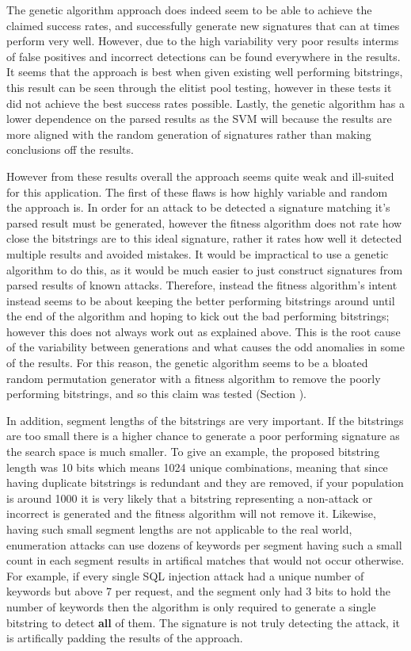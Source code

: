 The genetic algorithm approach does indeed seem to be able to achieve the claimed success rates, and successfully generate new signatures that can at times perform very well.  However, due to the high variability very poor results interms of false positives and incorrect detections can be found everywhere in the results.  It seems that the approach is best when given existing well performing bitstrings, this result can be seen through the elitist pool testing, however in these tests it did not achieve the best success rates possible.  Lastly, the genetic algorithm has a lower dependence on the parsed results as the SVM will because the results are more aligned with the random generation of signatures rather than making conclusions off the results.

However from these results overall the approach seems quite weak and ill-suited for this application.  The first of these flaws is how highly variable and random the approach is.  In order for an attack to be detected a signature matching it's parsed result must be generated, however the fitness algorithm does not rate how close the bitstrings are to this ideal signature, rather it rates how well it detected multiple results and avoided mistakes.  It would be impractical to use a genetic algorithm to do this, as it would be much easier to just construct signatures from parsed results of known attacks.  Therefore, instead the fitness algorithm's intent instead seems to be about keeping the better performing bitstrings around until the end of the algorithm and hoping to kick out the bad performing bitstrings; however this does not always work out as explained above.  This is the root cause of the variability between generations and what causes the odd anomalies in some of the results.  For this reason, the genetic algorithm seems to be a bloated random permutation generator with a fitness algorithm to remove the poorly performing bitstrings, and so this claim was tested (Section \label{sec:randDiscussion}).

In addition, segment lengths of the bitstrings are very important.  If the bitstrings are too small there is a higher chance to generate a poor performing signature as the search space is much smaller.  To give an example, the proposed bitstring length was 10 bits which means 1024 unique combinations, meaning that since having duplicate bitstrings is redundant and they are removed, if your population is around 1000 it is very likely that a bitstring representing a non-attack or incorrect is generated and the fitness algorithm will not remove it.  Likewise, having such small segment lengths are not applicable to the real world, enumeration attacks can use dozens of keywords per segment having such a small count in each segment results in artifical matches that would not occur otherwise.  For example, if every single SQL injection attack had a unique number of keywords but above 7 per request, and the segment only had 3 bits to hold the number of keywords then the algorithm is only required to generate a single bitstring to detect \textbf{all} of them.  The signature is not truly detecting the attack, it is artifically padding the results of the approach.

